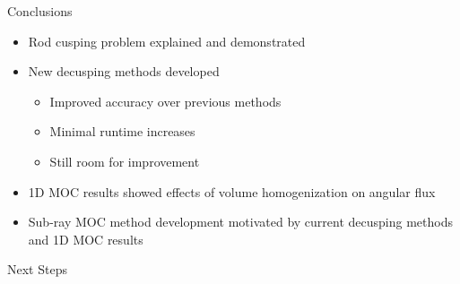 \begin{frame}[t]{Conclusions}
    
    \begin{itemize}
        \item Rod cusping problem explained and demonstrated
        \item New decusping methods developed
        \begin{itemize}
            \item Improved accuracy over previous methods
            \item Minimal runtime increases
            \item Still room for improvement
        \end{itemize}
        \item 1D MOC results showed effects of volume homogenization on angular flux
        \item Sub-ray MOC method development motivated by current decusping methods and 1D MOC results
    \end{itemize}
    
\end{frame}


\begin{frame}[t]{Next Steps}
    
    \begin{table}[h]
        \centering
    \end{table}
    
\end{frame}

